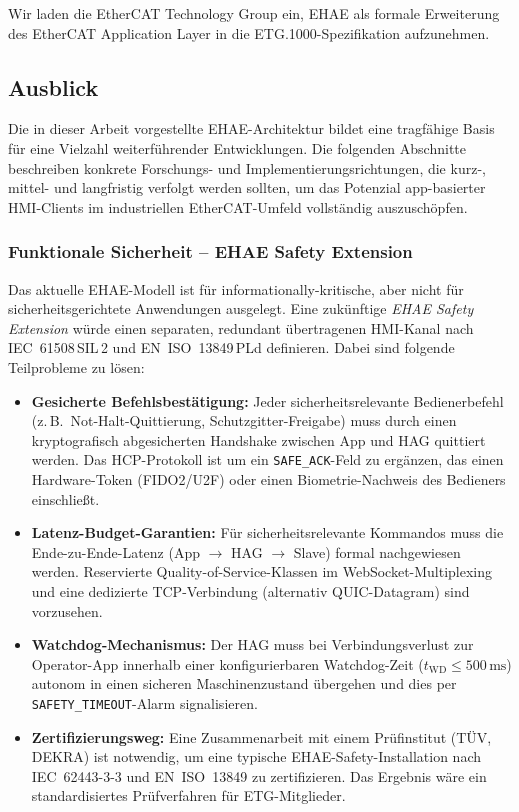 ﻿\documentclass[12pt,a4paper]{article}
\begin{document}
Wir laden die EtherCAT Technology Group ein, EHAE als formale Erweiterung des EtherCAT
Application Layer in die ETG.1000-Spezifikation aufzunehmen.

\subsection{Ausblick}

Die in dieser Arbeit vorgestellte EHAE-Architektur bildet eine tragfähige Basis für
eine Vielzahl weiterführender Entwicklungen. Die folgenden Abschnitte beschreiben
konkrete Forschungs- und Implementierungsrichtungen, die kurz-, mittel- und
langfristig verfolgt werden sollten, um das Potenzial app-basierter HMI-Clients im
industriellen EtherCAT-Umfeld vollständig auszuschöpfen.

\subsubsection*{Funktionale Sicherheit -- EHAE Safety Extension}

Das aktuelle EHAE-Modell ist für informationally-kritische, aber nicht für
sicherheitsgerichtete Anwendungen ausgelegt. Eine zukünftige \emph{EHAE Safety
Extension} würde einen separaten, redundant übertragenen HMI-Kanal nach
IEC~61508\,SIL\,2 und EN~ISO~13849\,PLd definieren. Dabei sind folgende
Teilprobleme zu lösen:

\begin{itemize}[leftmargin=2em]
  \item \textbf{Gesicherte Befehlsbestätigung:} Jeder sicherheitsrelevante
    Bedienerbefehl (z.\,B.\ Not-Halt-Quittierung, Schutzgitter-Freigabe) muss
    durch einen kryptografisch abgesicherten Handshake zwischen App und HAG
    quittiert werden. Das HCP-Protokoll ist um ein \verb|SAFE_ACK|-Feld zu
    ergänzen, das einen Hardware-Token (FIDO2/U2F) oder einen
    Biometrie-Nachweis des Bedieners einschließt.
  \item \textbf{Latenz-Budget-Garantien:} Für sicherheitsrelevante Kommandos
    muss die Ende-zu-Ende-Latenz (App $\to$ HAG $\to$ Slave) formal nachgewiesen
    werden. Reservierte Quality-of-Service-Klassen im WebSocket-Multiplexing und
    eine dedizierte TCP-Verbindung (alternativ QUIC-Datagram) sind vorzusehen.
  \item \textbf{Watchdog-Mechanismus:} Der HAG muss bei Verbindungsverlust zur
    Operator-App innerhalb einer konfigurierbaren Watchdog-Zeit ($t_{\text{WD}}
    \leq 500\,\si{\milli\second}$) autonom in einen sicheren Maschinenzustand
    übergehen und dies per \verb|SAFETY_TIMEOUT|-Alarm signalisieren.
  \item \textbf{Zertifizierungsweg:} Eine Zusammenarbeit mit einem Prüfinstitut
    (TÜV, DEKRA) ist notwendig, um eine typische EHAE-Safety-Installation nach
    IEC~62443-3-3 und EN~ISO~13849 zu zertifizieren. Das Ergebnis wäre ein
    standardisiertes Prüfverfahren für ETG-Mitglieder.
\end{itemize}
\end{document}
